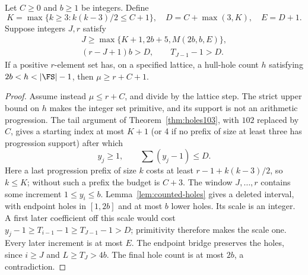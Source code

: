 \begin{lemma}\label{lem:hole-parameter}
Let $C\geq0$ and $b\geq1$ be integers. Define
\[
 K=\max\{k\geq3:k(k-3)/2\leq C+1\},\quad
 D=C+\max(3,K),\quad E=D+1.
\]
Suppose integers $J,r$ satisfy
\begin{gather*}
 J\geq\max\{K+1,2b+5,M(2b,b,E)\},\\
 (r-J+1)b>D,\qquad T_{J-1}-1>D.
\end{gather*}
If a positive $r$-element set has, on a specified lattice, a hull-hole count
$h$ satisfying $2b<h<|\FS|-1$, then $\mu\geq r+C+1$.
\end{lemma}
\begin{proof}
Assume instead $\mu\leq r+C$, and divide by the lattice step. The strict
upper bound on $h$ makes the integer set primitive, and its support is not
an arithmetic progression. The tail argument of
Theorem~\ref{thm:holes103}, with $102$ replaced by $C$, gives a starting
index at most $K+1$ (or 4 if no prefix of size at least three has progression
support) after which
\[
 y_j\geq1,\qquad \sum(y_j-1)\leq D.
\]
Here a last progression prefix of size $k$ costs at least
$r-1+k(k-3)/2$, so $k\leq K$; without such a prefix the budget is $C+3$.
The window $J,\ldots,r$ contains some increment $1\leq y_i\leq b$.
Lemma~\ref{lem:counted-holes} gives a deleted interval, with endpoint holes
in $[1,2b]$ and at most $b$ lower holes. Its scale is an integer. A first
later coefficient off this scale would cost
$y_j-1\geq T_{i-1}-1\geq T_{J-1}-1>D$; primitivity therefore makes the
scale one. Every later increment is at most $E$. The endpoint bridge
preserves the holes, since $i\geq J$ and $L\geq T_J>4b$.
The final hole count is at most $2b$, a contradiction.
\end{proof}

